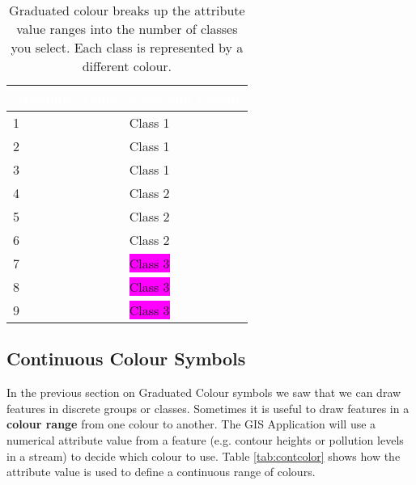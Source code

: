 \begin{table}[ht]
\centering
\caption{Graduated colour breaks up the attribute value ranges into the
number of classes you select. Each class is represented by a different
colour.}\medskip
 \label{tab:gradcolor}
 \begin{tabular}{|p{8cm}|p{8cm}|}
 \hline
 \rowcolor{black}
 \textcolor{white}{\textbf{Attribute Value}} &
 \textcolor{white}{\textbf{Class and Colour}} \\
 \hline 1 & \colorbox{Apricot}{Class 1} \\
 \hline 2 & \colorbox{Apricot}{Class 1} \\
 \hline 3 & \colorbox{Apricot}{Class 1} \\
 \hline 4 & \colorbox{PineGreen}{Class 2} \\
 \hline 5 & \colorbox{PineGreen}{Class 2} \\
 \hline 6 & \colorbox{PineGreen}{Class 2} \\
 \hline 7 & \colorbox{Magenta}{Class 3} \\
 \hline 8 & \colorbox{Magenta}{Class 3} \\ 
 \hline 9 & \colorbox{Magenta}{Class 3} \\
\hline
\end{tabular}
\end{table}

\subsection{Continuous Colour Symbols}

In the previous section on Graduated Colour symbols we saw that we can draw
features in discrete groups or classes. Sometimes it is useful to draw
features in a \textbf{colour range} from one colour to another. The GIS Application
will use a numerical attribute value from a feature (e.g. contour heights or
pollution levels in a stream) to decide which colour to use. Table
\ref{tab:contcolor} shows how the attribute value is used to define a
continuous range of colours.

